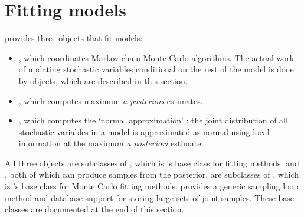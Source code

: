 \documentclass[]{jss}
\begin{document}
\section[Fitting Models]{Fitting models}
\label{chap:modelfitting}

 provides three objects that fit models:
\begin{itemize}
    \item {}, which coordinates Markov chain Monte Carlo algorithms. The actual work of updating stochastic variables conditional on the rest of the model is done by  objects, which are described in this section.
    \item {}, which computes maximum \emph{a posteriori} estimates.
    \item {}, which computes the `normal approximation' \citep{gelman}: the joint distribution of all stochastic variables in a model is approximated as normal using local information at the maximum \emph{a posteriori} estimate.
\end{itemize}

All three objects are subclasses of , which is 's base class for fitting methods.  and , both of which can produce samples from the posterior, are subclasses of , which is 's base class for Monte Carlo fitting methods.  provides a generic sampling loop method and database support for storing large sets of joint samples. These base classes are documented at the end of this section. %
\end{document}
